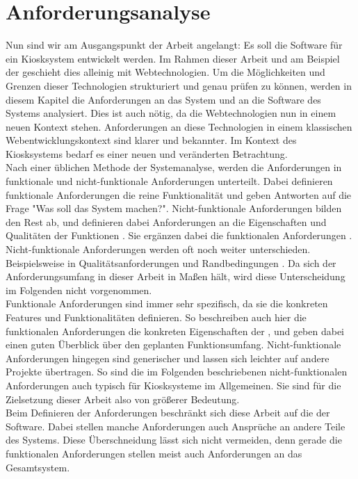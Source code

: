 \chapter{Anforderungsanalyse}
\label{chap:anforderungen}

Nun sind wir am Ausgangspunkt der Arbeit angelangt: Es soll die Software für ein Kiosksystem
entwickelt werden. Im Rahmen dieser Arbeit und am Beispiel der \shst{}
geschieht dies alleinig mit Webtechnologien. Um die Möglichkeiten und Grenzen dieser Technologien
strukturiert und genau prüfen zu können, werden in diesem Kapitel die Anforderungen an das System
und an die Software des Systems analysiert.
Dies ist auch nötig, da die Webtechnologien nun in einem neuen Kontext stehen. Anforderungen an diese
Technologien in einem klassischen Webentwicklungskontext sind klarer und bekannter. Im Kontext
des Kiosksystems bedarf es einer neuen und veränderten Betrachtung.\\

Nach einer üblichen Methode der Systemanalyse, werden die Anforderungen in funktionale und 
nicht-funktionale Anforderungen unterteilt. Dabei definieren funktionale Anforderungen die 
reine Funktionalität und geben Antworten 
auf die Frage "Was soll das System machen?". Nicht-funktionale Anforderungen bilden den Rest ab,
und definieren dabei Anforderungen an die Eigenschaften und Qualitäten der
Funktionen \cite{systemanalyse}. Sie ergänzen dabei die funktionalen 
Anforderungen \cite{systematisches}. Nicht-funktionale Anforderungen werden oft noch weiter unterschieden.
Beispielsweise in Qualitätsanforderungen und Randbedingungen \cite{systemanalyse,systematisches}.
Da sich der Anforderungsumfang in dieser Arbeit in Maßen hält, wird diese Unterscheidung im Folgenden
nicht vorgenommen.\\
Funktionale Anforderungen sind immer sehr spezifisch, da sie die konkreten Features
und Funktionalitäten definieren. So beschreiben auch hier die funktionalen Anforderungen die konkreten
Eigenschaften der \shst{}, und geben dabei einen guten Überblick über den geplanten Funktionsumfang.
Nicht-funktionale Anforderungen hingegen sind generischer und lassen sich leichter auf andere Projekte
übertragen. So sind die im Folgenden beschriebenen nicht-funktionalen Anforderungen auch typisch
für Kiosksysteme im Allgemeinen. Sie sind für die Zielsetzung dieser Arbeit also von 
größerer Bedeutung.\\
Beim Definieren der Anforderungen beschränkt sich diese Arbeit auf die der Software.
Dabei stellen manche Anforderungen auch Ansprüche an andere Teile des Systems. Diese Überschneidung
lässt sich nicht vermeiden, denn gerade die funktionalen Anforderungen stellen meist auch Anforderungen an das 
Gesamtsystem.\\ 


